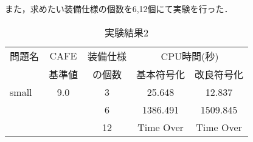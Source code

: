 また，求めたい装備仕様の個数を6,12個にて実験を行った．
\begin{table}[tb]
 \caption{実験結果2}
 \centering
 \small
 \begin{tabular}{l|c|c|c|c}\bhline
  問題名 & CAFE  & 装備仕様 & \multicolumn{2}{c}{CPU時間(秒)}\\ \cline{4-5}
        & 基準値 & の個数   & 基本符号化 & 改良符号化 \\ \hline
  small & 9.0   & 3       & 25.648    & 12.837   \\   
        &       & 6       & 1386.491  & 1509.845 \\
        &       & 12      & \textsf{Time Over} & \textsf{Time Over} \\ \hline
 \end{tabular}
\end{table}

